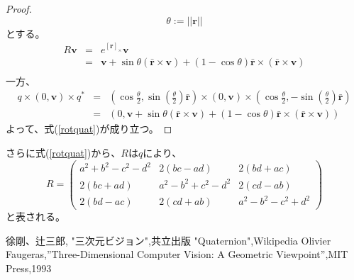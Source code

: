 \documentclass[10pt]{jarticle}
\begin{document}
\begin{proof}
    \begin{equation}
        \theta := ||\boldsymbol{r}||
    \end{equation}
    とする。
    \begin{eqnarray}
        R \boldsymbol{v} &=& e^{[\boldsymbol{r}]_{\times }} \boldsymbol{v} \\
        &=& \boldsymbol{v} + \sin \theta (\bar{ \boldsymbol{r} } \times \boldsymbol{v})
        + (1 - \cos \theta)\bar{\boldsymbol{r}} \times (\bar{\boldsymbol{r}} \times \boldsymbol{v})\\
    \end{eqnarray}
    一方、
    \begin{eqnarray}
        q \times (0, \boldsymbol{v}) \times q^*
        &=& (\cos \frac{\theta }{2}, \sin (\frac{\theta }{2}) \bar{\boldsymbol{r}})
	\times (0, \boldsymbol{v}) \times (\cos \frac{\theta }{2}, -\sin (\frac{\theta }{2}) \bar{\boldsymbol{r}})\\
        &=& (0, \boldsymbol{v} + \sin \theta (\bar{ \boldsymbol{r} } \times \boldsymbol{v})
        + (1 - \cos \theta)\bar{\boldsymbol{r}} \times (\bar{\boldsymbol{r}} \times \boldsymbol{v}) )
    \end{eqnarray}
    よって、式(\ref{rotquat})が成り立つ。
\end{proof}

さらに式(\ref{rotquat})から、$R$は$q$により、
\begin{equation}
    R = \left(
      \begin{array}{ccc}
          a^2 + b^2 -c^2 -d^2 & 2(bc-ad)& 2(bd+ac) \\
          2(bc+ad) & a^2-b^2+c^2-d^2& 2(cd-ab) \\
          2(bd-ac) & 2(cd+ab) & a^2-b^2-c^2+d^2 
      \end{array}
    \right)
\end{equation}
と表される。


\begin{thebibliography}{8}
徐剛、辻三郎, "三次元ビジョン",共立出版
"Quaternion",Wikipedia
Olivier Faugeras,''Three-Dimensional Computer Vision: A Geometric Viewpoint'',MIT Press,1993
\end{thebibliography}
\end{document}

